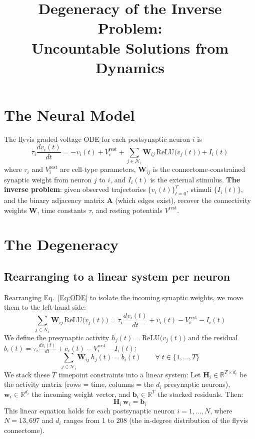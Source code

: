 \documentclass[11pt,a4paper]{article}
\title{Degeneracy of the Inverse Problem:\\Uncountable Solutions from Dynamics}
\date{}
\begin{document}
\maketitle

\section{The Neural Model}

The flyvis graded-voltage ODE for each postsynaptic neuron $i$ is
\begin{equation}
\tau_i\frac{dv_i(t)}{dt} = -v_i(t) + V_i^{\text{rest}}
+ \sum_{j\in\mathcal{N}_i} \mathbf{W}_{ij}\,
  \text{ReLU}\!\big(v_j(t)\big)
+ I_i(t)
\end{equation}
\label{Eq:ODE}
where $\tau_i$ and $V_i^{\mathrm{rest}}$ are cell-type parameters, $\mathbf{W}_{ij}$ is the connectome-constrained synaptic weight from neuron $j$ to $i$, and $I_i(t)$ is the external stimulus. \textbf{The inverse problem}: given observed trajectories $\{v_i(t)\}_{t=0}^{T}$, stimuli $\{I_i(t)\}$, and the binary adjacency matrix $\mathbf{A}$ (which edges exist), recover the connectivity weights $\mathbf{W}$, time constants $\tau$, and resting potentials $V^{\text{rest}}$.

\section{The Degeneracy}

\subsection{Rearranging to a linear system per neuron}

Rearranging Eq.~\ref{Eq:ODE} to isolate the incoming synaptic weights, we move them to the left-hand side:
\begin{equation}
\sum_{j\in\mathcal{N}_i} \mathbf{W}_{ij}\, \text{ReLU}\!\big(v_j(t)\big) = \tau_i \frac{dv_i(t)}{dt} + v_i(t) - V_i^{\text{rest}} - I_i(t)
\end{equation}
\label{Eq:ODE2}
We define the presynaptic activity $h_j(t) = \text{ReLU}\!\big(v_j(t)\big)$ and the residual $b_i(t) = \tau_i \frac{dv_i(t)}{dt} + v_i(t) - V_i^{\text{rest}} - I_i(t)$:
\begin{equation}
\sum_{j \in \mathcal{N}_i} \mathbf{W}_{ij}\, h_j(t) = b_i(t) \qquad \forall\; t \in \{1, \dots, T\}
\end{equation}
We stack these $T$ timepoint constraints into a linear system: Let $\mathbf{H}_i \in \mathbb{R}^{T \times d_i}$ be the activity matrix (rows = time, columns = the $d_i$ presynaptic neurons), $\mathbf{w}_i \in \mathbb{R}^{d_i}$ the incoming weight vector, and $\mathbf{b}_i \in \mathbb{R}^T$ the stacked residuals. Then:
\begin{equation}
\mathbf{H}_i\, \mathbf{w}_i = \mathbf{b}_i
\end{equation}
This linear equation holds for each postsynaptic neuron $i = 1, \ldots, N$, where $N = 13{,}697$ and $d_i$ ranges from 1 to 208 (the in-degree distribution of the flyvis connectome).
\end{document}
